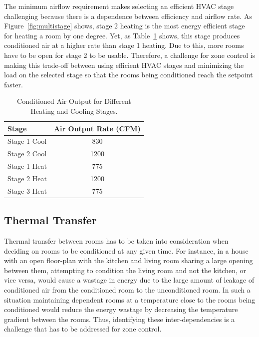 The minimum airflow requirement makes selecting an efficient HVAC stage
challenging because there is a dependence between efficiency and airflow rate. As
Figure~\ref{fig:multistage} shows, stage 2 heating is the most energy efficient
stage for heating a room by one degree. Yet, as Table~\ref{table:stageAirflow}
shows, this stage produces conditioned air at a higher rate than stage 1
heating. Due to this, more rooms have to be open for stage 2 to be
usable. Therefore, a challenge for zone control is making this trade-off between
using efficient HVAC stages and minimizing the load on the selected stage so
that the rooms being conditioned reach the setpoint faster. 

\begin{table}[t]
{
  \begin{tabular}{|l|c|} \hline
    Stage & Air Output Rate (CFM) \\ \hline\hline
    Stage 1 Cool & 830
    \\ \hline
    Stage 2 Cool & 1200
    \\ \hline
    Stage 1 Heat & 775
    \\ \hline
    Stage 2 Heat & 1200
    \\ \hline
    Stage 3 Heat & 775
    \\ \hline
    \end{tabular}}
\caption[Conditioned Air Output for Different Heating and Cooling
  Stages]{Conditioned Air Output for Different Heating and Cooling Stages.}
\label{table:stageAirflow}
\end{table}


\subsection{Thermal Transfer}
\label{sec:thermalTransfer}
Thermal transfer between rooms has to be taken into consideration when deciding
on rooms to be conditioned at any given time. For instance, in a house with an
open floor-plan with the kitchen and living room sharing a large opening between
them, attempting to condition the living room and not the kitchen, or vice
versa, would cause a wastage in energy due to the large amount of leakage of
conditioned air from the conditioned room to the unconditioned room. In such a
situation maintaining dependent rooms at a temperature close to the rooms being
conditioned would reduce the energy wastage by decreasing the temperature
gradient between the rooms. Thus, identifying these inter-dependencies is a
challenge that has to be addressed for zone control.

